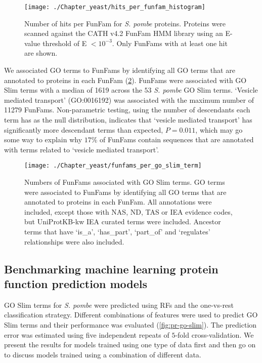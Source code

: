 \begin{figure}[!hbt]
    \centering
    \texttt{[image: ./Chapter\_yeast/hits\_per\_funfam\_histogram]}
    \caption{%
        Number of hits per FunFam for \emph{S. pombe} proteins.
        Proteins were scanned against the CATH v4.2 FunFam HMM library using an E-value threshold of E $< 10^{-3}$.
        Only FunFams with at least one hit are shown.
    }
    \label{fig:hits_per_funfam}
\end{figure}

We associated GO terms to FunFams by identifying all GO terms that are annotated to proteins in each FunFam (\ref{fig:funfams_per_go_slim_term}). FunFams were associated with GO Slim terms with a median of \num{1619} across the $53$ \emph{S. pombe} GO Slim terms. `Vesicle mediated transport' (GO:0016192) was associated with the maximum number of \num{11279} FunFams. Non-parametric testing, using the number of descendants each term has as the null distribution, indicates that `vesicle mediated transport' has significantly more descendant terms than expected, $P = 0.011$, which may go some way to explain why $17\%$ of FunFams contain sequences that are annotated with terms related to `vesicle mediated transport'.

\begin{figure}[!hbt]
    \centering
    \texttt{[image: ./Chapter\_yeast/funfams\_per\_go\_slim\_term]}
    \caption{%
        Numbers of FunFams associated with GO Slim terms.
        GO terms were associated to FunFams by identifying all GO terms that are annotated to proteins in each FunFam.
        All annotations were included, except those with NAS, ND, TAS or IEA evidence codes, but UniProtKB-kw IEA curated terms were included.
        Ancestor terms that have ‘is\_a’, ‘has\_part’, ‘part\_of’ and ‘regulates’ relationships were also included.
    }
    \label{fig:funfams_per_go_slim_term}
\end{figure}

\subsection{Benchmarking machine learning protein function prediction models}

GO Slim terms for \emph{S. pombe} were predicted using RFs and the one-vs-rest classification strategy. Different combinations of features were used to predict GO Slim terms and their performance was evaluated (\ref{fig:pr-go-slim}). The prediction error was estimated using five independent repeats of $5$-fold cross-validation. We present the results for models trained using one type of data first and then go on to discuss models trained using a combination of different data.

